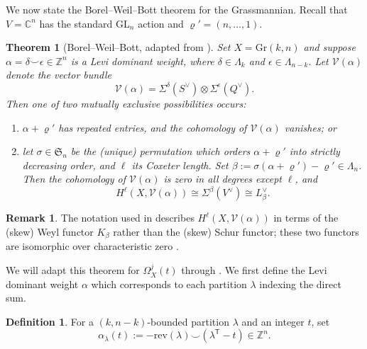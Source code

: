 \documentclass{amsart}
\newcommand\T{\mathsf{T}}
\newcommand\Gr{\mathrm{Gr}}
\newcommand\GL{\mathrm{GL}}
\theoremstyle{plain}
\newtheorem{theorem}{Theorem}[section]
\theoremstyle{definition}
\newtheorem{definition}[definition]{Definition}
\newtheorem{remark}[remark]{Remark}
\numberwithin{equation}{section}
\begin{document}
We now state the Borel--Weil--Bott theorem for the Grassmannian. Recall that $V=\mathbb{C}^n$ has the standard $\GL_n$ action and $\varrho'=(n,\dots,1)$.
\begin{theorem}[Borel--Weil--Bott, adapted from {\cite[Corollary 4.1.9]{Wey03}}]\label{thm:bwb}
    Set $X=\Gr(k,n)$ and suppose $\alpha=\delta\smile\epsilon\in\mathbb{Z}^n$ is a Levi dominant weight, where $\delta\in\Lambda_k$ and $\epsilon\in\Lambda_{n-k}$. Let $\mathcal V(\alpha)$ denote the vector bundle
    \[\mathcal V(\alpha) = \Sigma^{\delta}(S^\vee) \otimes \Sigma^{\epsilon} (Q^\vee).
    \]
    Then one of two mutually exclusive possibilities occurs:
    \begin{enumerate}
        \item $\alpha + \varrho'$ has repeated entries, and the cohomology of $\mathcal V(\alpha)$ vanishes; or
        \item let $\sigma\in\mathfrak{S}_n$ be the (unique) permutation which orders $\alpha+\varrho'$ into strictly decreasing order, and $\ell$ its Coxeter length. Set $\beta:=\sigma(\alpha+\varrho')-\varrho'\in\Lambda_n$. Then the cohomology of $\mathcal V(\alpha)$ is zero in all degrees except $\ell$, and
\[H^\ell(X,\mathcal{V}(\alpha))\cong\Sigma^{\beta}(V^\vee)\cong L_{\beta}^\vee.\]
    \end{enumerate}
\end{theorem}


\begin{remark}
    The notation used in \cite{Wey03} describes $H^\ell(X,\mathcal V(\alpha))$ in terms of the (skew) Weyl functor $K_{\beta}$ rather than the (skew) Schur functor; these two functors are isomorphic over characteristic zero \cite[Proposition 2.1.18]{Wey03}.
\end{remark}

We will adapt this theorem for $\Omega_X^j(t)$ through . We first define the Levi dominant weight $\alpha$ which corresponds to each partition $\lambda$ indexing the direct sum.

\begin{definition}\label{def:alpha}
For a $(k,n-k)$-bounded partition $\lambda$ and an integer $t$, set
\[\alpha_\lambda(t):=-\mathrm{rev}(\lambda)\smile(\lambda^\T-t)\in\mathbb{Z}^n.\]
\end{definition}
\end{document}
